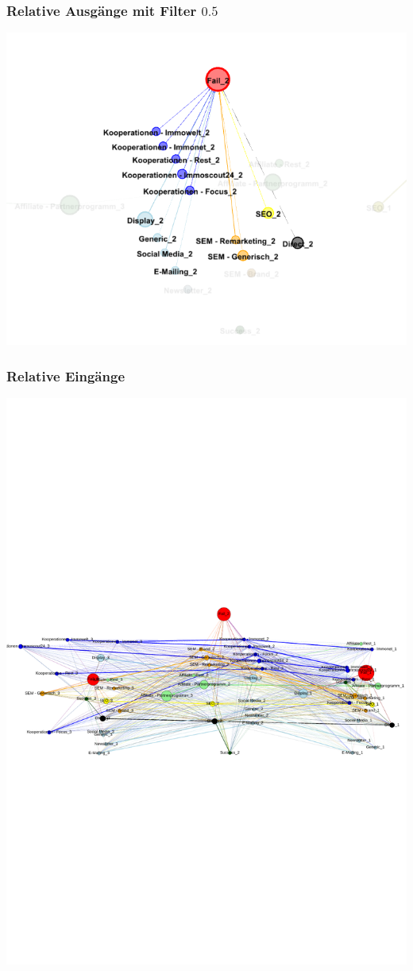 \begin{frame}\frametitle{Relative Ausgänge mit Filter $0.5$}
	\centering\includegraphics[scale=0.3]{out_filter_50_fail.png}
\end{frame}

\begin{frame}\frametitle{Relative Eingänge}
	\centering\includegraphics[scale=0.75]{in_labels.pdf}
\end{frame}

